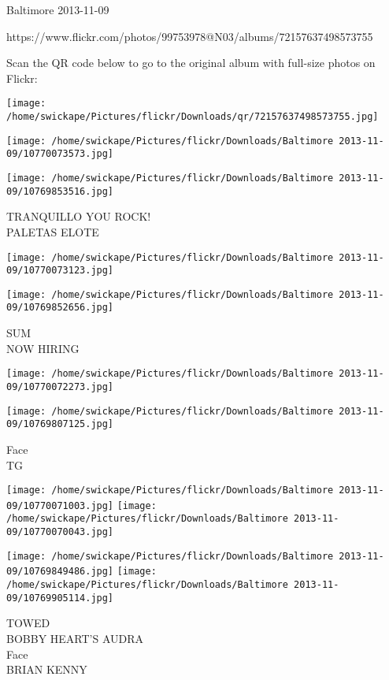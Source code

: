 \documentclass[10pt,letterpaper]{article}
\begin{document}
Baltimore 2013-11-09

https://www.flickr.com/photos/99753978@N03/albums/72157637498573755

Scan the QR code below to go to the original album with full-size photos on Flickr:

\texttt{[image: /home/swickape/Pictures/flickr/Downloads/qr/72157637498573755.jpg]}
\pagebreak

\texttt{[image: /home/swickape/Pictures/flickr/Downloads/Baltimore 2013-11-09/10770073573.jpg]}

\vspace{0.25in}
\texttt{[image: /home/swickape/Pictures/flickr/Downloads/Baltimore 2013-11-09/10769853516.jpg]}

TRANQUILLO YOU ROCK!\\
PALETAS ELOTE
\pagebreak

\texttt{[image: /home/swickape/Pictures/flickr/Downloads/Baltimore 2013-11-09/10770073123.jpg]}

\vspace{0.25in}
\texttt{[image: /home/swickape/Pictures/flickr/Downloads/Baltimore 2013-11-09/10769852656.jpg]}

SUM\\
NOW HIRING
\pagebreak

\texttt{[image: /home/swickape/Pictures/flickr/Downloads/Baltimore 2013-11-09/10770072273.jpg]}

\vspace{0.25in}
\texttt{[image: /home/swickape/Pictures/flickr/Downloads/Baltimore 2013-11-09/10769807125.jpg]}

Face\\
TG
\pagebreak

\texttt{[image: /home/swickape/Pictures/flickr/Downloads/Baltimore 2013-11-09/10770071003.jpg]}
\texttt{[image: /home/swickape/Pictures/flickr/Downloads/Baltimore 2013-11-09/10770070043.jpg]}

\texttt{[image: /home/swickape/Pictures/flickr/Downloads/Baltimore 2013-11-09/10769849486.jpg]}
\texttt{[image: /home/swickape/Pictures/flickr/Downloads/Baltimore 2013-11-09/10769905114.jpg]}

TOWED\\
BOBBY HEART'S AUDRA\\
Face\\
BRIAN KENNY
\pagebreak
\end{document}
